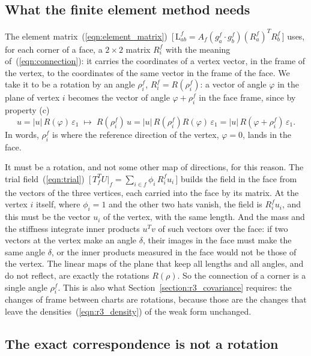 \subsection{What the finite element method needs}

The element matrix~(\ref{eqn:element_matrix})~[\,$\mathrm L^f_{ab} = A_f(g_a^f\cdot g_b^f)(R_a^f)^TR_b^f$\,] uses, for each corner of a face, a $2\times 2$ matrix $R_i^f$ with the meaning of~(\ref{eqn:connection}): it carries the coordinates of a vertex vector, in the frame of the vertex, to the coordinates of the same vector in the frame of the face. We take it to be a rotation by an angle $\rho_i^f$, $R_i^f = R(\rho_i^f)$: a vector of angle $\varphi$ in the plane of vertex $i$ becomes the vector of angle $\varphi + \rho_i^f$ in the face frame, since by property (c)
\begin{equation*}
u = |u|\,R(\varphi)\,\varepsilon_1 \;\longmapsto\; R(\rho_i^f)\,u = |u|\,R(\rho_i^f)R(\varphi)\,\varepsilon_1 = |u|\,R(\varphi + \rho_i^f)\,\varepsilon_1 .
\end{equation*}
In words, $\rho_i^f$ is where the reference direction of the vertex, $\varphi = 0$, lands in the face.

It must be a rotation, and not some other map of directions, for this reason. The trial field~(\ref{eqn:trial})~[\,$T_f^TU|_f = \sum_{i \in f} \phi_i\, R_i^f u_i$\,] builds the field in the face from the vectors of the three vertices, each carried into the face by its matrix. At the vertex $i$ itself, where $\phi_i = 1$ and the other two hats vanish, the field is $R_i^fu_i$, and this must be the vector $u_i$ of the vertex, with the same length. And the mass and the stiffness integrate inner products $u^Tv$ of such vectors over the face: if two vectors at the vertex make an angle $\delta$, their images in the face must make the same angle $\delta$, or the inner products measured in the face would not be those of the vertex. The linear maps of the plane that keep all lengths and all angles, and do not reflect, are exactly the rotations $R(\rho)$. So the connection of a corner is a single angle $\rho_i^f$. This is also what Section~\ref{section:r3_covariance} requires: the changes of frame between charts are rotations, because those are the changes that leave the densities~(\ref{eqn:r3_density}) of the weak form unchanged.

\subsection{The exact correspondence is not a rotation}

